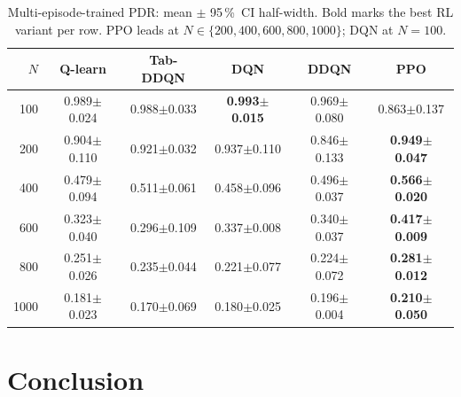 \documentclass[conference]{IEEEtran}
\begin{document}
\begin{table}[t]
\centering
\caption{Multi-episode-trained PDR: mean $\pm$ 95\,\%~CI half-width.
  Bold marks the best RL variant per row.
  PPO leads at $N\in\{200,400,600,800,1000\}$; DQN at $N=100$.}
\label{tab:rl_pdr}
\setlength{\tabcolsep}{3pt}
{\scriptsize
\begin{tabular}{r ccccc}
\toprule
$N$ & Q-learn & Tab-DDQN & DQN & DDQN & PPO \\
\midrule
100  & 0.989{\tiny$\pm$0.024} & 0.988{\tiny$\pm$0.033} & \textbf{0.993{\tiny$\pm$0.015}} & 0.969{\tiny$\pm$0.080} & 0.863{\tiny$\pm$0.137} \\
200  & 0.904{\tiny$\pm$0.110} & 0.921{\tiny$\pm$0.032} & 0.937{\tiny$\pm$0.110} & 0.846{\tiny$\pm$0.133} & \textbf{0.949{\tiny$\pm$0.047}} \\
400  & 0.479{\tiny$\pm$0.094} & 0.511{\tiny$\pm$0.061} & 0.458{\tiny$\pm$0.096} & 0.496{\tiny$\pm$0.037} & \textbf{0.566{\tiny$\pm$0.020}} \\
600  & 0.323{\tiny$\pm$0.040} & 0.296{\tiny$\pm$0.109} & 0.337{\tiny$\pm$0.008} & 0.340{\tiny$\pm$0.037} & \textbf{0.417{\tiny$\pm$0.009}} \\
800  & 0.251{\tiny$\pm$0.026} & 0.235{\tiny$\pm$0.044} & 0.221{\tiny$\pm$0.077} & 0.224{\tiny$\pm$0.072} & \textbf{0.281{\tiny$\pm$0.012}} \\
1000  & 0.181{\tiny$\pm$0.023} & 0.170{\tiny$\pm$0.069} & 0.180{\tiny$\pm$0.025} & 0.196{\tiny$\pm$0.004} & \textbf{0.210{\tiny$\pm$0.050}} \\
\bottomrule
\end{tabular}
}
\end{table}

\section{Conclusion}
\end{document}
